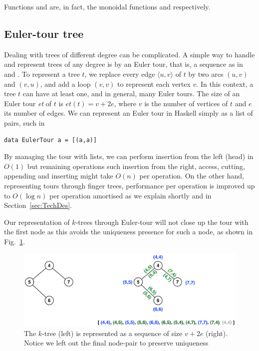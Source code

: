 Functions  and  are, in fact, the monoidal functions  and  respectively. 

\subsection{Euler-tour tree} 

Dealing with trees of different degree can be complicated. A simple way to handle and represent trees of any degree is by an Euler tour, that is, a sequence as in \cite{Rand-DynGs-Algos} and \cite{WerneckR-PhD}. To represent a tree $t$, we replace every edge $\langle u,v \rangle$ of $t$ by two arcs $(u,v)$ and $(v,u)$, and add a loop $(v,v)$ to represent each vertex $v$. In this context, a tree $t$ can have at least one, and in general, many Euler tours. The size of an Euler tour \textit{et} of $t$ is $et(t) = v + 2e $, where $v$ is the number of vertices of $t$ and $e$ its number of edges. We can represent an Euler tour in Haskell simply as a list of pairs, such in 

\begin{lstlisting}
data EulerTour a = [(a,a)] 
\end{lstlisting}

By managing the tour with lists, we can perform insertion from the left (head) in $O(1)$ but remaining operations such insertion from the right, access, cutting, appending and inserting might take $O(n)$ per operation.
On the other hand, representing tours through finger trees, performance per operation is improved up to $O(\log n)$ per operation amortised as we explain shortly and in Section~\ref{sec:TechDes}. 

Our representation of $k$-trees through Euler-tour will not close up the tour with the first node as this avoids the uniqueness presence for such a node, as shown in Fig.~\ref{fig:Euler-tour}.

\begin{figure}
\begin{center}
\includegraphics[scale=0.35]{./Images/Euler-tour} 
\end{center}
\caption{The $k$-tree (left) is represented as a sequence of size $v+2e$ (right). Notice we left out the final node-pair to preserve uniqueness}
\label{fig:Euler-tour}
\end{figure}



